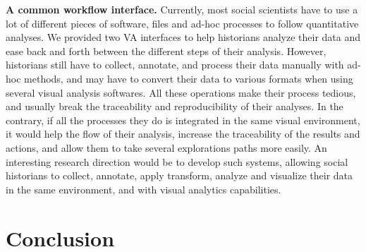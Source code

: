 \noindent\textbf{A common workflow interface.} Currently, most social scientists have to use a lot of different pieces of software, files and ad-hoc processes to follow quantitative analyses.
We provided two VA interfaces to help historians analyze their data and ease back and forth between the different steps of their analysis.
However, historians still have to collect, annotate, and process their data manually with ad-hoc methods, and may have to convert their data to various formats when using several visual analysis softwares.
All these operations make their process tedious, and usually break the traceability and reproducibility of their analyses.
In the contrary, if all the processes they do is integrated in the same visual environment, it would help the flow of their analysis, increase the traceability of the results and actions, and allow them to take several explorations paths more easily.
An interesting research direction would be to develop such systems, allowing social historians to collect, annotate, apply transform, analyze and visualize their data in the same environment, and with visual analytics capabilities.



\section{Conclusion}

